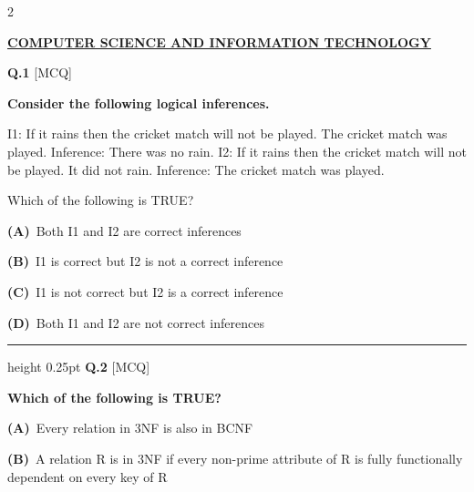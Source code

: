 \documentclass[a4paper,10pt,twoside]{article}
\begin{document}
\begin{multicols}{2}

\vspace{8pt}
\noindent\textbf{\large\underline{COMPUTER SCIENCE AND INFORMATION TECHNOLOGY}}\\[2pt]
\vspace{4pt}

\noindent\textbf{Q.1} \hfill {\footnotesize\textsf{[MCQ]}}
\par\vspace{2pt}
{\bfseries Consider the following logical inferences.
\par\smallskip
I1: If it rains then the cricket match will not be played.
The cricket match was played.
Inference: There was no rain.
I2: If it rains then the cricket match will not be played.
It did not rain.
Inference: The cricket match was played.
\par\smallskip
Which of the following is TRUE? \par}
\par\vspace{2pt}\noindent
\textbf{(A)}~Both I1 and I2 are correct inferences\par\vspace{2pt}\noindent
\textbf{(B)}~I1 is correct but I2 is not a correct inference\par\vspace{2pt}\noindent
\textbf{(C)}~I1 is not correct but I2 is a correct inference\par\vspace{2pt}\noindent
\textbf{(D)}~Both I1 and I2 are not correct inferences
\par\vspace{6pt}\hrule height 0.25pt\vspace{6pt}
\noindent\textbf{Q.2} \hfill {\footnotesize\textsf{[MCQ]}}
\par\vspace{2pt}
{\bfseries Which of the following is TRUE? \par}
\par\vspace{2pt}\noindent
\textbf{(A)}~Every relation in 3NF is also in BCNF\par\vspace{2pt}\noindent
\textbf{(B)}~A relation R is in 3NF if every non-prime attribute of R is fully functionally dependent on every \newline  \newline key of R\par\vspace{2pt}\noindent

\end{multicols}
\end{document}

